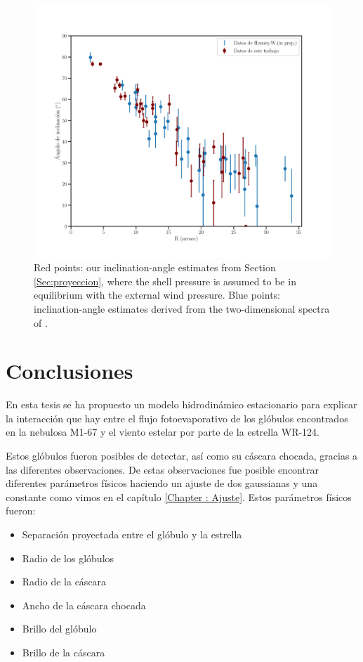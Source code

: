 \documentclass{book}
\begin{document}
\begin{figure}[htb]
    \centering
    \includegraphics[width=\textwidth]{imagenes_corregidas/W.pdf}
    \caption{Red points: our inclination-angle estimates from Section
      \ref{Sec:proyeccion}, where the shell pressure is assumed to be
      in equilibrium with the external wind pressure. Blue points:
      inclination-angle estimates derived from the two-dimensional
      spectra of \cite{Zavala:2022}.}
    \label{fig:ang_Will}
\end{figure}
\chapter{Conclusiones}

En esta tesis se ha propuesto un modelo hidrodinámico estacionario
para explicar la interacción que hay entre el flujo fotoevaporativo de
los glóbulos encontrados en la nebulosa M1-67 y el viento estelar por
parte de la estrella WR-124.

Estos glóbulos fueron posibles de detectar, así como su cáscara
chocada, gracias a las diferentes observaciones. De estas
observaciones fue posible encontrar diferentes parámetros físicos
haciendo un ajuste de dos gaussianas y una constante como vimos en el
capítulo \ref{Chapter : Ajuste}. Estos parámetros físicos fueron:

\begin{itemize}
    \item Separación proyectada entre el glóbulo y la estrella
    \item Radio de los glóbulos
    \item Radio de la cáscara
    \item Ancho de la cáscara chocada
    \item Brillo del glóbulo
    \item Brillo de la cáscara
\end{itemize}
\end{document}

